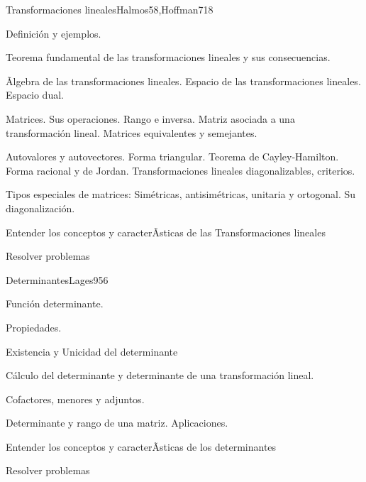 \begin{syllabus}
\begin{unit}{Transformaciones lineales}{Halmos58,Hoffman71}{8}
   \begin{topics}
         \item  Definición y ejemplos.
	 \item  Teorema fundamental de las transformaciones lineales y sus consecuencias.
         \item  Ãlgebra de las transformaciones lineales. Espacio de las transformaciones lineales. Espacio dual.
	 \item  Matrices. Sus operaciones. Rango e inversa. Matriz asociada a una transformación lineal. Matrices equivalentes y semejantes.
         \item  Autovalores y autovectores. Forma triangular. Teorema de Cayley-Hamilton. Forma racional y de  Jordan. Transformaciones lineales diagonalizables, criterios.
	 \item  Tipos especiales de matrices: Simétricas, antisimétricas, unitaria y ortogonal. Su diagonalización.
   \end{topics}

   \begin{unitgoals}
         \item  Entender los conceptos y caracterÃ­sticas de las Transformaciones lineales
         \item  Resolver problemas
   \end{unitgoals}
\end{unit}

\begin{unit}{Determinantes}{Lages95}{6}
   \begin{topics}
         \item  Función determinante.
	 \item  Propiedades.
         \item  Existencia y Unicidad del determinante
	 \item  Cálculo del determinante y determinante de una transformación lineal.
         \item  Cofactores, menores y adjuntos.
	\item Determinante y rango de una matriz. Aplicaciones.
   \end{topics}

   \begin{unitgoals}
         \item  Entender los conceptos y caracterÃ­sticas de los determinantes
         \item  Resolver problemas
   \end{unitgoals}
\end{unit}


\end{syllabus}
